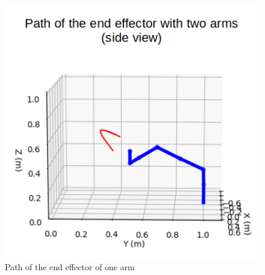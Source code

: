 \documentclass[a4paper, 11.5pt, conference]{ieeeconf}      %
\begin{document}
\begin{figure}[H]
	\includegraphics[scale=0.25]{images/two_arms_side.png}
	\caption{Path of the end effector of one arm}
	\label{fig:two_arm_avoidance}
\end{figure}
\end{document}
